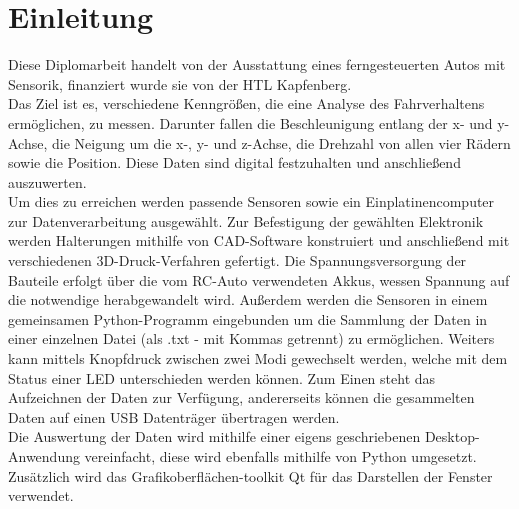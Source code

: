 \section{Einleitung}
\label{sec:einleitung}
Diese Diplomarbeit handelt von der Ausstattung eines ferngesteuerten Autos mit Sensorik, finanziert wurde sie von der HTL Kapfenberg.\\
Das Ziel ist es, verschiedene Kenngrößen, die eine Analyse des Fahrverhaltens ermöglichen, zu messen. Darunter fallen die Beschleunigung entlang der x- und y-Achse, die Neigung um die x-, y- und z-Achse, die Drehzahl von allen vier Rädern sowie die Position. Diese Daten sind digital festzuhalten und anschließend auszuwerten. \\
Um dies zu erreichen werden passende Sensoren sowie ein Einplatinencomputer zur Datenverarbeitung ausgewählt. Zur Befestigung der gewählten Elektronik werden Halterungen mithilfe von CAD-Software konstruiert und anschließend mit verschiedenen 3D-Druck-Verfahren gefertigt. Die Spannungsversorgung der Bauteile erfolgt über die vom RC-Auto verwendeten Akkus, wessen Spannung auf die notwendige herabgewandelt wird. Außerdem werden die Sensoren in einem gemeinsamen Python-Programm eingebunden um die Sammlung der Daten in einer einzelnen Datei (als .txt - mit Kommas getrennt) zu ermöglichen. Weiters kann mittels Knopfdruck zwischen zwei Modi gewechselt werden, welche mit dem Status einer LED unterschieden werden können. Zum Einen steht das Aufzeichnen der Daten zur Verfügung, andererseits können die gesammelten Daten auf einen \ac{USB} Datenträger übertragen werden. \\
Die Auswertung der Daten wird mithilfe einer eigens geschriebenen Desktop-Anwendung vereinfacht, diese wird ebenfalls mithilfe von Python umgesetzt. Zusätzlich wird das Grafikoberflächen-toolkit Qt für das Darstellen der Fenster verwendet.